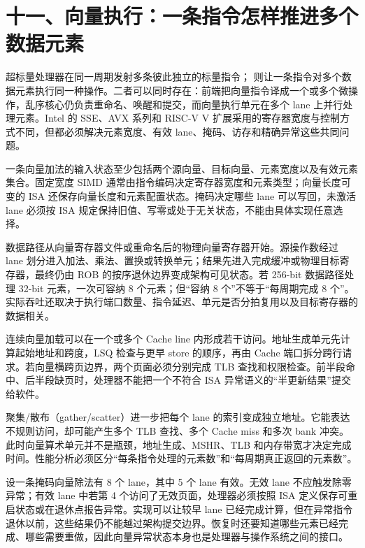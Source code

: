 \section{十一、向量执行：一条指令怎样推进多个数据元素}

超标量处理器在同一周期发射多条彼此独立的标量指令； 则让一条指令对多个数据元素执行同一种操作。二者可以同时存在：前端把向量指令译成一个或多个微操作，乱序核心仍负责重命名、唤醒和提交，而向量执行单元在多个 lane 上并行处理元素。Intel 的 SSE、AVX 系列和 RISC-V V 扩展采用的寄存器宽度与控制方式不同，但都必须解决元素宽度、有效 lane、掩码、访存和精确异常这些共同问题。\cite{intel-sdm,riscv-vector}

一条向量加法的输入状态至少包括两个源向量、目标向量、元素宽度以及有效元素集合。固定宽度 SIMD 通常由指令编码决定寄存器宽度和元素类型；向量长度可变的 ISA 还保存向量长度和元素配置状态。掩码决定哪些 lane 可以写回，未激活 lane 必须按 ISA 规定保持旧值、写零或处于无关状态，不能由具体实现任意选择。

数据路径从向量寄存器文件或重命名后的物理向量寄存器开始。源操作数经过 lane 划分进入加法、乘法、置换或转换单元；结果先进入完成缓冲或物理目标寄存器，最终仍由 ROB 的按序退休边界变成架构可见状态。若 256-bit 数据路径处理 32-bit 元素，一次可容纳 8 个元素；但“容纳 8 个”不等于“每周期完成 8 个”。实际吞吐还取决于执行端口数量、指令延迟、单元是否分拍复用以及目标寄存器的数据相关。

连续向量加载可以在一个或多个 Cache line 内形成若干访问。地址生成单元先计算起始地址和跨度，LSQ 检查与更早 store 的顺序，再由 Cache 端口拆分跨行请求。若向量横跨页边界，两个页面必须分别完成 TLB 查找和权限检查。前半段命中、后半段缺页时，处理器不能把一个不符合 ISA 异常语义的“半更新结果”提交给软件。

聚集/散布（gather/scatter）进一步把每个 lane 的索引变成独立地址。它能表达不规则访问，却可能产生多个 TLB 查找、多个 Cache miss 和多次 bank 冲突。此时向量算术单元并不是瓶颈，地址生成、MSHR、TLB 和内存带宽才决定完成时间。性能分析必须区分“每条指令处理的元素数”和“每周期真正返回的元素数”。

设一条掩码向量除法有 8 个 lane，其中 5 个 lane 有效。无效 lane 不应触发除零异常；有效 lane 中若第 4 个访问了无效页面，处理器必须按照 ISA 定义保存可重启状态或在退休点报告异常。实现可以让较早 lane 已经完成计算，但在异常指令退休以前，这些结果仍不能越过架构提交边界。恢复时还要知道哪些元素已经完成、哪些需要重做，因此向量异常状态本身也是处理器与操作系统之间的接口。

